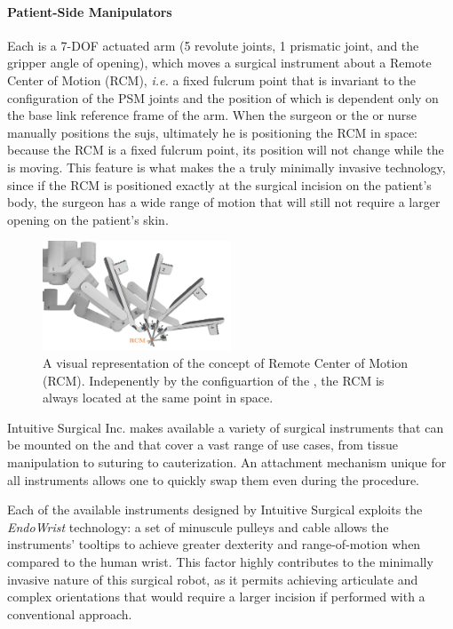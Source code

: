 \documentclass[../main.tex]{subfiles}
\begin{document}
\paragraph{Patient-Side Manipulators} Each \psm is a 7-DOF actuated arm (5 revolute joints, 1 prismatic joint, and the gripper angle of opening), which moves a surgical instrument about a Remote Center of Motion (RCM), \textit{i.e.} a fixed fulcrum point that is invariant to the configuration of the PSM joints and the position of which is dependent only on the base link reference frame of the arm. When the surgeon or the \ac{or} nurse manually positions the \acp{suj}, ultimately he is positioning the RCM in space: because the RCM is a fixed fulcrum point, its position will not change while the \psm is moving. This feature is what makes the \davinci a truly minimally invasive technology, since if the RCM is positioned exactly at the surgical incision on the patient's body, the surgeon has a wide range of motion that will still not require a larger opening on the patient's skin. 

\begin{figure}[h!]
    \centering
    \includegraphics[width=0.5\textwidth]{images/rcm.jpg}
    \caption{A visual representation of the concept of Remote Center of Motion (RCM). Indepenently by the configuartion of the \psm, the RCM is always located at the same point in space.}
    \label{fig:rcm}
\end{figure}

Intuitive Surgical Inc. makes available a variety of surgical instruments that can be mounted on the \psms and that cover a vast range of use cases, from tissue manipulation to suturing to cauterization. An attachment mechanism unique for all instruments allows one to quickly swap them even during the procedure.

Each of the available instruments designed by Intuitive Surgical exploits the \textit{EndoWrist}\cright\xspace technology: a set of minuscule pulleys and cable allows the instruments' tooltips to achieve greater dexterity and range-of-motion when compared to the human wrist. This factor highly contributes to the minimally invasive nature of this surgical robot, as it permits achieving articulate and complex orientations that would require a larger incision if performed with a conventional approach.
\end{document}
